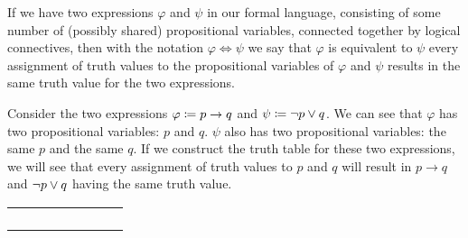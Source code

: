 \begin{definition}[Equivalence]
    If we have two expressions $\varphi$ and $\psi$ in our formal language,
    consisting of some number of (possibly shared) propositional variables, connected together by logical connectives,
    then with the notation $\varphi \iff \psi$ we say that $\varphi$ is equivalent to $\psi$
    \iffbydefn every assignment of truth values to the propositional variables of $\varphi$ and $\psi$ results
    in the same truth value for the two expressions.
\end{definition}
\begin{example}
    Consider the two expressions $\varphi \coloneqq p \rightarrow q$ and $\psi \coloneqq \neg p \vee q$.
    We can see that $\varphi$ has two propositional variables: $p$ and $q$.
    $\psi$ also has two propositional variables: the same $p$ and the same $q$.
    If we construct the truth table for these two expressions,
    we will see that every assignment of truth values to $p$ and $q$ will result in $p \rightarrow q$ and $\neg p \vee q$
    having the same truth value.

    \begin{table}[H]
        \centering
        \begin{tabular}{|CcCc||CcCc|}
            \hline
             &  &  & \\ \hline
            \thead{$\top$} & \thead{$\top$} &  & \\
            \thead{$\top$} & \thead{$\bot$} &  & \\
            \thead{$\bot$} & \thead{$\top$} &  &  \\
            \thead{$\bot$} & \thead{$\bot$} &  &  \\ \hline
        \end{tabular}
    \end{table}
\end{example}

